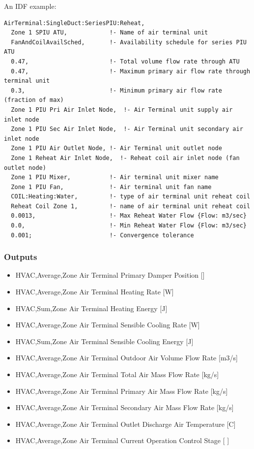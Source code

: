 An IDF example:

\begin{lstlisting}
AirTerminal:SingleDuct:SeriesPIU:Reheat,
  Zone 1 SPIU ATU,            !- Name of air terminal unit
  FanAndCoilAvailSched,       !- Availability schedule for series PIU ATU
  0.47,                       !- Total volume flow rate through ATU
  0.47,                       !- Maximum primary air flow rate through terminal unit
  0.3,                        !- Minimum primary air flow rate (fraction of max)
  Zone 1 PIU Pri Air Inlet Node,  !- Air Terminal unit supply air inlet node
  Zone 1 PIU Sec Air Inlet Node,  !- Air Terminal unit secondary air inlet node
  Zone 1 PIU Air Outlet Node, !- Air Terminal unit outlet node
  Zone 1 Reheat Air Inlet Node,  !- Reheat coil air inlet node (fan outlet node)
  Zone 1 PIU Mixer,           !- Air terminal unit mixer name
  Zone 1 PIU Fan,             !- Air terminal unit fan name
  COIL:Heating:Water,         !- type of air terminal unit reheat coil
  Reheat Coil Zone 1,         !- name of air terminal unit reheat coil
  0.0013,                     !- Max Reheat Water Flow {Flow: m3/sec}
  0.0,                        !- Min Reheat Water Flow {Flow: m3/sec}
  0.001;                      !- Convergence tolerance
\end{lstlisting}

\subsubsection{Outputs}\label{outputs-7}

\begin{itemize}
\item
  HVAC,Average,Zone Air Terminal Primary Damper Position {[]}
\item
  HVAC,Average,Zone Air Terminal Heating Rate {[}W{]}
\item
  HVAC,Sum,Zone Air Terminal Heating Energy {[}J{]}
\item
  HVAC,Average,Zone Air Terminal Sensible Cooling Rate {[}W{]}
\item
  HVAC,Sum,Zone Air Terminal Sensible Cooling Energy {[}J{]}
\item
  HVAC,Average,Zone Air Terminal Outdoor Air Volume Flow Rate {[}m3/s{]}
\item
  HVAC,Average,Zone Air Terminal Total Air Mass Flow Rate {[}kg/s{]}
\item
  HVAC,Average,Zone Air Terminal Primary Air Mass Flow Rate {[}kg/s{]}
\item
  HVAC,Average,Zone Air Terminal Secondary Air Mass Flow Rate {[}kg/s{]}
\item
  HVAC,Average,Zone Air Terminal Outlet Discharge Air Temperature {[}C{]}
\item
  HVAC,Average,Zone Air Terminal Current Operation Control Stage {[} {]}
\end{itemize}

